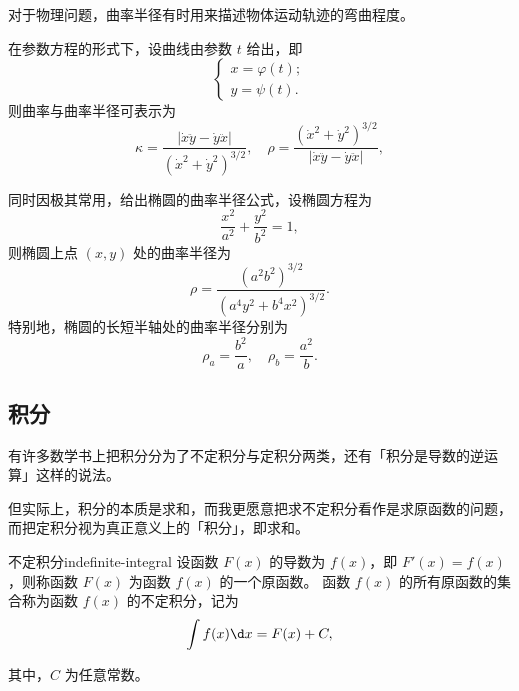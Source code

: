 对于物理问题，曲率半径有时用来描述物体运动轨迹的弯曲程度。

在参数方程的形式下，设曲线由参数 $ t $ 给出，即
\begin{equation*}
    \begin{cases}
        x = \varphi (t) ; \\
        y = \psi (t) .
    \end{cases}
\end{equation*}
则曲率与曲率半径可表示为
\begin{equation}
    \kappa = \frac{|\dot{x} \ddot{y} - \dot{y} \ddot{x}|}{(\dot{x}^2 + \dot{y}^2)^{3/2}},\quad \rho = \frac{(\dot{x}^2 + \dot{y}^2)^{3/2}}{|\dot{x} \ddot{y} - \dot{y} \ddot{x}|},
\end{equation}

同时因极其常用，给出椭圆的曲率半径公式，设椭圆方程为
\begin{equation*}
    \frac{x^2}{a^2} + \frac{y^2}{b^2} = 1,
\end{equation*}
则椭圆上点 $ (x, y) $ 处的曲率半径为
\begin{equation}
    \rho = \frac{(a^2 b^2)^{3/2}}{(a^4 y^2 + b^4 x^2)^{3/2}}.
\end{equation}
特别地，椭圆的长短半轴处的曲率半径分别为
\begin{equation*}
    \rho_a = \frac{b^2}{a},\quad \rho_b = \frac{a^2}{b}.
\end{equation*}

\subsection{积分}\label{subsec:integral}

有许多数学书上把积分分为了不定积分与定积分两类，还有「积分是导数的逆运算」这样的说法。

但实际上，积分的本质是求和，而我更愿意把求不定积分看作是求原函数的问题，而把定积分视为真正意义上的「积分」，即求和。

\begin{definition}{不定积分}{indefinite-integral}
    设函数 $ F(x) $ 的导数为 $ f(x) $，即 $ F'(x) = f(x) $，则称函数 $ F(x) $ 为函数 $ f(x) $ 的一个原函数。
    函数 $ f(x) $ 的所有原函数的集合称为函数 $ f(x) $ 的不定积分，记为
    \begin{equation*}
        \int f(x) \d x = F(x) + C,
    \end{equation*}

    其中，$ C $ 为任意常数。
\end{definition}

